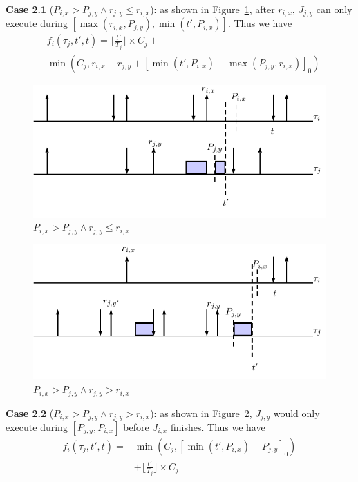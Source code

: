 \textbf{Case 2.1} ($P_{i,x}>P_{j,y}\wedge r_{j,y}\leq r_{i,x}$): as shown in  Figure~\ref{fig:case5}, after $r_{i,x}$,  $J_{j,y}$ can only execute during $[\max(r_{i,x},P_{j,y}),	\min(t',P_{i,x})]$. Thus we have
	\begin{align*}
		&f_i(\tau_j,t',t)=\lfloor \frac{t'}{T_j}\rfloor\times C_j+\\
		&\min\left(C_j,r_{i,x}-r_{j,y}+[\min(t',P_{i,x})-\max(P_{j,y},r_{i,x})]_0\right)
	\end{align*}


\begin{figure}[h!]
 \centering
\includegraphics[scale=0.7]{Figure/C4}  
\caption{$P_{i,x}>P_{j,y}\wedge r_{j,y}\leq r_{i,x}$}
  \label{fig:case5}
\end{figure}

\begin{figure}[h!]
 \centering
\includegraphics[scale=0.7]{Figure/C41}  
\caption{$P_{i,x}>P_{j,y}\wedge r_{j,y}> r_{i,x} $}
  \label{fig:case6}
\end{figure}

\textbf{Case 2.2} ($P_{i,x}>P_{j,y}\wedge r_{j,y}> r_{i,x}$): as shown in  Figure~\ref{fig:case6}, $J_{j,y}$ would only execute during $[P_{j,y},P_{i,x}]$ before $J_{i,x}$ finishes. Thus we have
\begin{align*}
	f_i(\tau_j,t',t)=&\min\left(C_j,[\min(t',P_{i,x})-P_{j,y}]_0\right)\\&+\lfloor \frac{t'}{T_j}\rfloor\times C_j
\end{align*}






